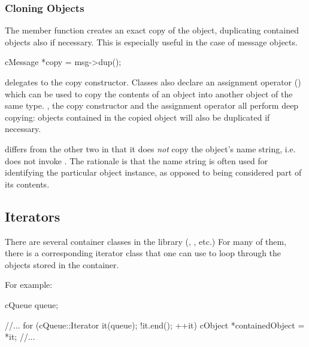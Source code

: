 
\subsubsection{Cloning Objects}
\label{sec:sim-lib:dup}

The  member function creates an exact copy of the
object, duplicating
contained objects also if necessary. This is especially useful in the
case of message objects.

\begin{cpp}
cMessage *copy = msg->dup();
\end{cpp}

 delegates to the copy constructor. Classes also declare
an assignment operator () which can be used to copy the contents
of an object into another object of the same type. , the copy
constructor and the assignment operator all perform deep copying: objects
contained in the copied object will also be duplicated if necessary.

 differs from the other two in that it does \textit{not}
copy the object's name string, i.e. does not invoke .
The rationale is that the name string is often used for identifying the particular
object instance, as opposed to being considered part of its contents.


\subsection{Iterators}
\label{sec:sim-lib:iterators}

There are several container classes in the library (,
, etc.) For many of them, there is a corresponding
iterator class that one can use to loop through the objects stored in
the container.

For example:

\begin{cpp}
cQueue queue;

//...
for (cQueue::Iterator it(queue); !it.end(); ++it) {
    cObject *containedObject = *it;
    //...
}
\end{cpp}

